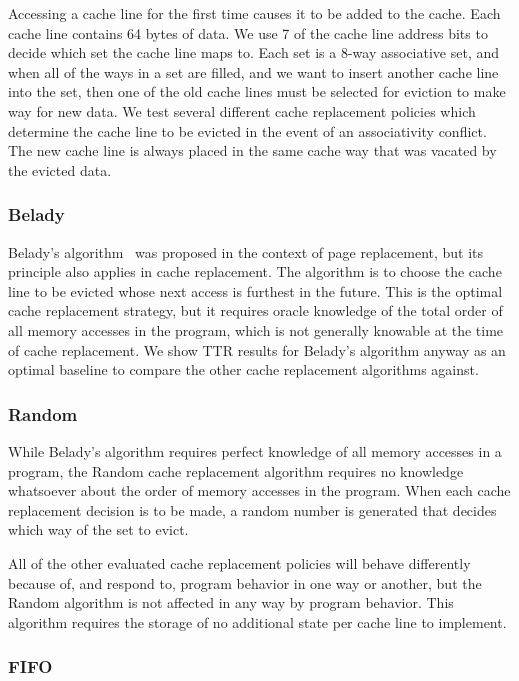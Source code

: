 Accessing a cache line for the first time causes it to be added to the cache.
Each cache line contains 64 bytes of data.
We use 7 of the cache line address bits to decide which set the cache line maps to.
Each set is a 8-way associative set, and when all of the ways in a set are filled,
 and we want to insert another cache line into the set, then one of the old cache lines must be selected for eviction to make way for new data.
We test several different cache replacement policies which determine the cache line to be evicted in the event of an associativity conflict.
The new cache line is always placed in the same cache way that was vacated by the evicted data.

\subsubsection{Belady}

Belady's algorithm~\cite{belady66} was proposed in the context of page replacement, but its principle also applies in cache replacement.  The algorithm is to choose the cache line to be evicted whose next access is furthest in the future.  This is the optimal cache replacement strategy, but it requires oracle knowledge of the total order of all memory accesses in the program, which is not generally knowable at the time of cache replacement.  We show TTR results for Belady's algorithm anyway as an optimal baseline to compare the other cache replacement algorithms against.

\subsubsection{Random}

While Belady's algorithm requires perfect knowledge of all memory accesses in a program, the Random cache replacement algorithm requires no knowledge whatsoever about the order of memory accesses in the program.  When each cache replacement decision is to be made, a random number is generated that decides which way of the set to evict.

All of the other evaluated cache replacement policies will behave differently because of, and respond to, program behavior in one way or another, but the Random algorithm is not affected in any way by program behavior.  This algorithm requires the storage of no additional state per cache line to implement.

\subsubsection{FIFO}

